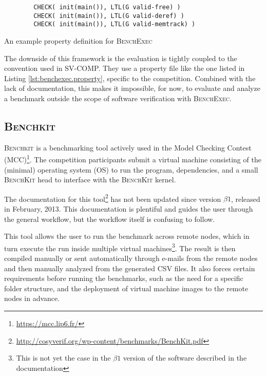 \begin{listing}
	\begin{verbatim}
		CHECK( init(main()), LTL(G valid-free) )
		CHECK( init(main()), LTL(G valid-deref) )
		CHECK( init(main()), LTL(G valid-memtrack) )
	\end{verbatim}
	\caption{An example property definition for \textsc{BenchExec}}
	\label{lst:benchexec.property}
\end{listing}

The downside of this framework is the evaluation is tightly coupled to the convention used in SV-COMP.
They use a property file like the one listed in Listing \ref{lst:benchexec.property}, specific to the competition.
Combined with the lack of documentation, this makes it impossible, for now, to evaluate and analyze a benchmark outside the scope of software verification with \textsc{BenchExec}.


\subsection{\textsc{Benchkit}}

\textsc{Benchkit} \citep{benchkit:2013} is a benchmarking tool actively used in the Model Checking Contest (MCC)\footnote{\href{https://mcc.lip6.fr/}{https://mcc.lip6.fr/}}.
The competition participants submit a virtual machine consisting of the (minimal) operating system (OS) to run the program, dependencies, and a small \textsc{BenchKit} head to interface with the \textsc{BenchKit} kernel.

The documentation for this tool\footnote{\href{http://cosyverif.org/wp-content/benchmarks/BenchKit.pdf}{http://cosyverif.org/wp-content/benchmarks/BenchKit.pdf}} has not been updated since version $\beta1$, released in February, 2013.
This documentation is plentiful and guides the user through the general workflow, but the workflow itself is confusing to follow.

This tool allows the user to run the benchmark across remote nodes, which in turn execute the run inside multiple virtual machines\footnote{This is not yet the case in the $\beta1$ version of the software described in the documentation}.
The result is then compiled manually or sent automatically through e-mails from the remote nodes and then manually analyzed from the generated CSV files.
It also forces certain requirements before running the benchmarks, such as the need for a specific folder structure, and the deployment of virtual machine images to the remote nodes in advance.

